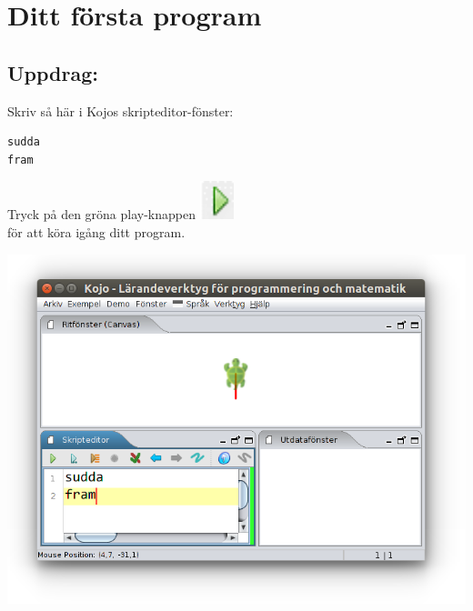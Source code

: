 \chapter{Ditt första program}
\begin{multicols}{2}
\section*{\color{BrickRed}Uppdrag:}
Skriv så här i Kojos skripteditor-fönster:

\begin{lstlisting}[basicstyle={\ttfamily\fontsize{48}{58}\selectfont},numbers=none]
sudda
fram
\end{lstlisting}
        
Tryck på den gröna play-knappen 
\includegraphics[width=1.0cm]{../img/play.png}
\\

för att köra igång ditt program.

\columnbreak

\begin{center}
\includegraphics[width=14.0cm]{../img/fram.png}
\end{center}

\end{multicols}

